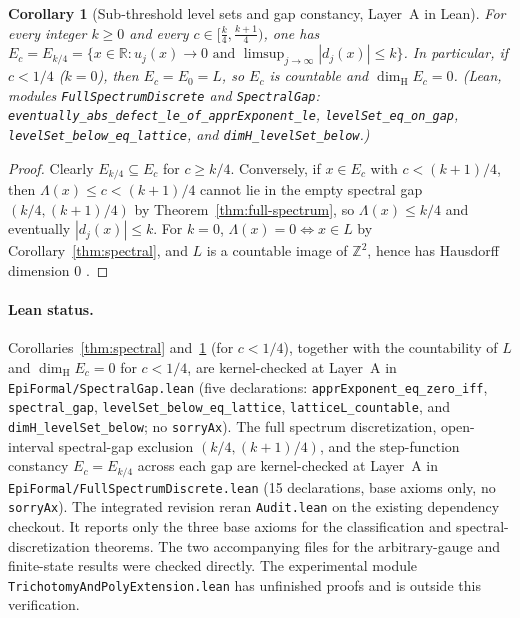 \documentclass[11pt]{article}
\newtheorem{corollary}[theorem]{Corollary}
\theoremstyle{definition}
\theoremstyle{remark}
\newcommand{\R}{\mathbb{R}}
\newcommand{\Z}{\mathbb{Z}}
\newcommand{\dimH}{\dim_{\mathrm{H}}}
\newcommand{\Lam}{\Lambda}
\begin{document}
\begin{corollary}[Sub-threshold level sets and gap constancy, Layer~A in Lean]\label{thm:sub}
For every integer $k\ge0$ and every $c\in\bigl[\frac{k}{4},\frac{k+1}{4}\bigr)$,
one has $E_c=E_{k/4}=\{x\in\R:u_j(x)\to0\text{ and }\limsup_{j\to\infty}|d_j(x)|\le k\}$.
In particular, if $c<1/4$ ($k=0$), then $E_c=E_0=L$, so $E_c$ is countable and
$\dimH E_c=0$.
(Lean, modules \texttt{FullSpectrumDiscrete} and \texttt{SpectralGap}:
\texttt{eventually\_\allowbreak abs\_\allowbreak defect\_\allowbreak le\_\allowbreak of\_\allowbreak apprExponent\_\allowbreak le},
\texttt{levelSet\_\allowbreak eq\_\allowbreak on\_\allowbreak gap},
\texttt{levelSet\_\allowbreak below\_\allowbreak eq\_\allowbreak lattice}, and
\texttt{dimH\_\allowbreak levelSet\_\allowbreak below}.)
\end{corollary}

\begin{proof}
Clearly $E_{k/4}\subseteq E_c$ for $c\ge k/4$. Conversely, if $x\in E_c$ with
$c<(k+1)/4$, then $\Lam(x)\le c<(k+1)/4$ cannot lie in the empty spectral gap
$(k/4,(k+1)/4)$ by Theorem~\ref{thm:full-spectrum}, so $\Lam(x)\le k/4$ and
eventually $|d_j(x)|\le k$. For $k=0$, $\Lam(x)=0\iff x\in L$ by
Corollary~\ref{thm:spectral}, and $L$ is a countable image of $\Z^2$, hence has
Hausdorff dimension $0$ \cite{Falconer}.
\end{proof}

\paragraph{Lean status.} Corollaries~\ref{thm:spectral} and~\ref{thm:sub} (for
$c<1/4$), together with the countability of $L$ and $\dimH E_c=0$ for $c<1/4$,
are kernel-checked at Layer~A in \texttt{EpiFormal/\allowbreak SpectralGap.lean}
(five declarations: \texttt{apprExponent\_eq\_zero\_iff},
\texttt{spectral\_gap}, \texttt{levelSet\_below\_eq\_lattice},
\texttt{latticeL\_countable}, and \texttt{dimH\_levelSet\_below}; no
\texttt{sorryAx}). The full spectrum discretization, open-interval spectral-gap
exclusion $(k/4,(k+1)/4)$, and the step-function constancy $E_c=E_{k/4}$ across
each gap are kernel-checked at Layer~A in
\texttt{EpiFormal/\allowbreak FullSpectrumDiscrete.lean} (15 declarations, base
axioms only, no \texttt{sorryAx}). The integrated revision reran \texttt{Audit.lean} on the existing
dependency checkout. It reports only the three base axioms for the
classification and spectral-discretization theorems. The two accompanying
files for the arbitrary-gauge and finite-state results were checked directly.
The experimental module
\texttt{Trichotomy\allowbreak And\allowbreak Poly\allowbreak Extension.lean}
has unfinished proofs and is outside this verification.
\end{document}
